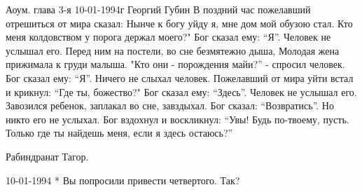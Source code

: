 Аоум. глава 3-я 10-01-1994г
Георгий Губин
В поздний час пожелавший отрешиться от мира сказал:
Нынче к богу уйду я, мне дом мой обузою стал.
Кто меня колдовством у порога держал моего?"
Бог сказал ему: ``Я''.
Человек не услышал его.
Перед ним на постели, во сне безмятежно дыша,
Молодая жена прижимала к груди малыша.
"Кто они - порождения майи?'' - спросил человек.
Бог сказал ему: ``Я''.
Ничего не слыхал человек.
Пожелавший от мира уйти встал и крикнул: ``Где ты, божество?"
Бог сказал ему: ``Здесь''.
Человек не услышал его.
Завозился ребенок, заплакал во сне, завздыхал.
Бог сказал: ``Возвратись''.
Но никто его не услыхал.
Бог вздохнул и воскликнул: ``Увы! Будь по-твоему, пусть. 
Только где ты найдешь меня, если я здесь остаюсь?''

    Рабиндранат Тагор.

10-01-1994 
  * Вы попросили  привести четвертого. Так?

